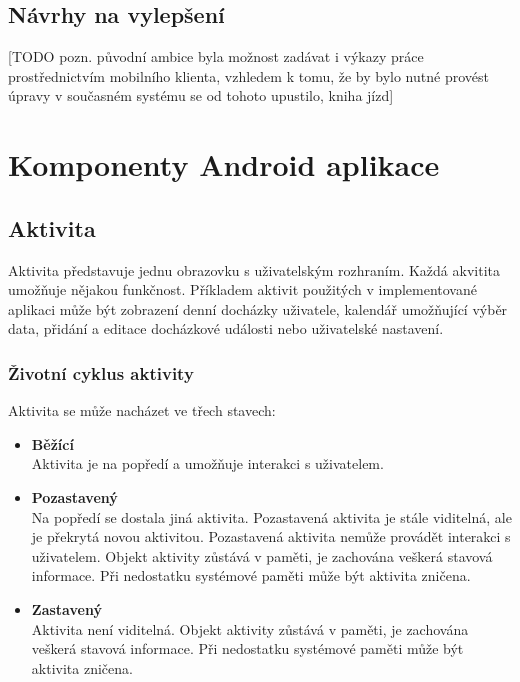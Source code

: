 \documentclass{diplomka}
\begin{document}
\subsection{Návrhy na vylepšení}

[TODO  pozn. původní ambice byla možnost zadávat i výkazy práce prostřednictvím mobilního klienta, vzhledem k tomu, že by bylo nutné provést úpravy v současném systému se od tohoto upustilo, kniha jízd]
\section{Komponenty Android aplikace}

\subsection{Aktivita}
Aktivita představuje jednu obrazovku s uživatelským rozhraním. Každá akvitita umožňuje nějakou funkčnost. Příkladem aktivit použitých v implementované aplikaci může být zobrazení denní docházky uživatele, kalendář umožňující výběr data, přidání a editace docházkové události nebo uživatelské nastavení.

\subsubsection*{Životní cyklus aktivity}
Aktivita se může nacházet ve třech stavech:

\begin{itemize}[]
\item \textbf{Běžící}\\
Aktivita je na popředí a umožňuje interakci s uživatelem.
\item \textbf{Pozastavený}\\
Na popředí se dostala jiná aktivita. Pozastavená aktivita je stále viditelná, ale je překrytá novou aktivitou. Pozastavená aktivita nemůže provádět interakci s uživatelem. Objekt aktivity zůstává v paměti, je zachována veškerá stavová informace. Při nedostatku systémové paměti může být aktivita zničena.
\item \textbf{Zastavený}\\
Aktivita není viditelná. Objekt aktivity zůstává v paměti, je zachována veškerá stavová informace. Při nedostatku systémové paměti může být aktivita zničena.
\end{itemize}
\end{document}
